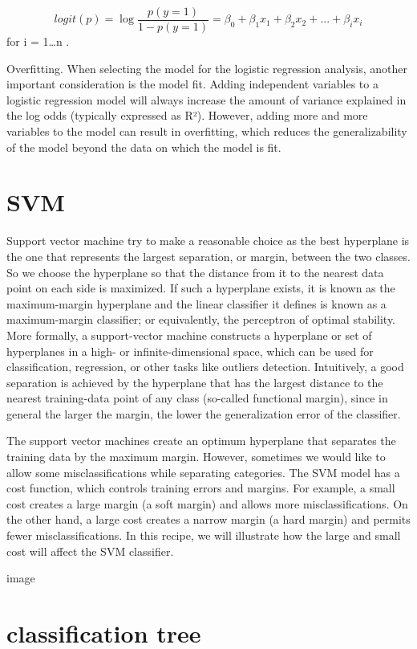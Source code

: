 \documentclass[
]{report}
\begin{document}
\[logit(p)= \log \frac{p(y=1)}{1-p(y=1)}= \beta_0 + \beta_1x_1 + \beta_2x_2 + ... + \beta_ix_i\]
for i = 1\ldots n .

Overfitting. When selecting the model for the logistic regression analysis, another important consideration is the model fit. Adding independent variables to a logistic regression model will always increase the amount of variance explained in the log odds (typically expressed as R²). However, adding more and more variables to the model can result in overfitting, which reduces the generalizability of the model beyond the data on which the model is fit.

\hypertarget{svm}{%
\section{SVM}\label{svm}}

Support vector machine try to make a reasonable choice as the best hyperplane is the one that represents the largest separation, or margin, between the two classes. So we choose the hyperplane so that the distance from it to the nearest data point on each side is maximized. If such a hyperplane exists, it is known as the maximum-margin hyperplane and the linear classifier it defines is known as a maximum-margin classifier; or equivalently, the perceptron of optimal stability.
More formally, a support-vector machine constructs a hyperplane or set of hyperplanes in a high- or infinite-dimensional space, which can be used for classification, regression, or other tasks like outliers detection. Intuitively, a good separation is achieved by the hyperplane that has the largest distance to the nearest training-data point of any class (so-called functional margin), since in general the larger the margin, the lower the generalization error of the classifier.

The support vector machines create an optimum hyperplane that separates the training data by the maximum margin. However, sometimes we would like to allow some misclassifications while separating categories. The SVM model has a cost function, which controls training errors and margins. For example, a small cost creates a large margin (a soft margin) and allows more misclassifications. On the other hand, a large cost creates a narrow margin (a hard margin) and permits fewer misclassifications. In this recipe, we will illustrate how the large and small cost will affect the SVM classifier.

image

\hypertarget{classification-tree}{%
\section{classification tree}\label{classification-tree}}
\end{document}
